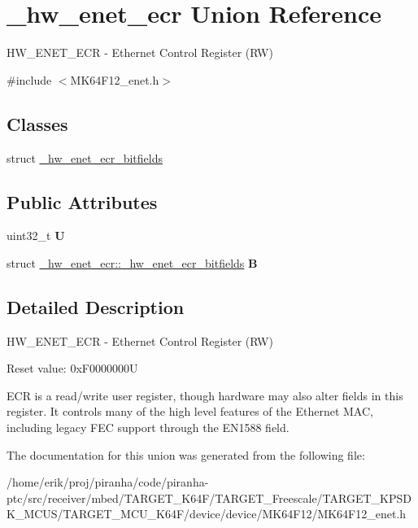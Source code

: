 \hypertarget{union__hw__enet__ecr}{}\section{\+\_\+hw\+\_\+enet\+\_\+ecr Union Reference}
\label{union__hw__enet__ecr}


H\+W\+\_\+\+E\+N\+E\+T\+\_\+\+E\+CR -\/ Ethernet Control Register (RW)  




{\ttfamily \#include $<$M\+K64\+F12\+\_\+enet.\+h$>$}

\subsection*{Classes}
\begin{DoxyCompactItemize}
\item 
struct \hyperlink{struct__hw__enet__ecr_1_1__hw__enet__ecr__bitfields}{\+\_\+hw\+\_\+enet\+\_\+ecr\+\_\+bitfields}
\end{DoxyCompactItemize}
\subsection*{Public Attributes}
\begin{DoxyCompactItemize}
\item 
uint32\+\_\+t {\bfseries U}\hypertarget{union__hw__enet__ecr_a8dae0e03eaea89e7eab40e27e2a8bfaf}{}\label{union__hw__enet__ecr_a8dae0e03eaea89e7eab40e27e2a8bfaf}

\item 
struct \hyperlink{struct__hw__enet__ecr_1_1__hw__enet__ecr__bitfields}{\+\_\+hw\+\_\+enet\+\_\+ecr\+::\+\_\+hw\+\_\+enet\+\_\+ecr\+\_\+bitfields} {\bfseries B}\hypertarget{union__hw__enet__ecr_ae7d5bd86537e298ece995d3fb2e58075}{}\label{union__hw__enet__ecr_ae7d5bd86537e298ece995d3fb2e58075}

\end{DoxyCompactItemize}


\subsection{Detailed Description}
H\+W\+\_\+\+E\+N\+E\+T\+\_\+\+E\+CR -\/ Ethernet Control Register (RW) 

Reset value\+: 0x\+F0000000U

E\+CR is a read/write user register, though hardware may also alter fields in this register. It controls many of the high level features of the Ethernet M\+AC, including legacy F\+EC support through the E\+N1588 field. 

The documentation for this union was generated from the following file\+:\begin{DoxyCompactItemize}
\item 
/home/erik/proj/piranha/code/piranha-\/ptc/src/receiver/mbed/\+T\+A\+R\+G\+E\+T\+\_\+\+K64\+F/\+T\+A\+R\+G\+E\+T\+\_\+\+Freescale/\+T\+A\+R\+G\+E\+T\+\_\+\+K\+P\+S\+D\+K\+\_\+\+M\+C\+U\+S/\+T\+A\+R\+G\+E\+T\+\_\+\+M\+C\+U\+\_\+\+K64\+F/device/device/\+M\+K64\+F12/M\+K64\+F12\+\_\+enet.\+h\end{DoxyCompactItemize}
